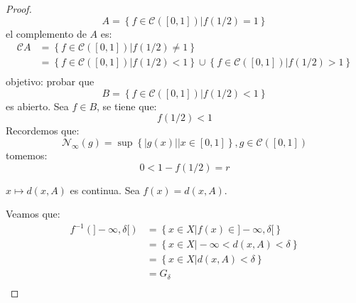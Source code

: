 \documentclass[12pt]{report}
\theoremstyle{largebreak}
\newcommand\abs[1]{\ensuremath{\left|#1\right|}}
\begin{document}
    \begin{proof}
        \begin{equation*}
            A=\left\{f\in\mathcal{C}([0,1])\Big|f(1/2)=1 \right\}
        \end{equation*}
        el complemento de $A$ es:
        \begin{equation*}
            \begin{split}
                \mathcal{C}A&=\left\{f\in\mathcal{C}([0,1])\Big| f(1/2)\neq 1 \right\}\\
                &=\left\{f\in\mathcal{C}([0,1])\Big| f(1/2)<1 \right\}\cup\left\{f\in\mathcal{C}([0,1])\Big| f(1/2)>1 \right\} \\
            \end{split}
        \end{equation*}
        objetivo: probar que
        \begin{equation*}
            B=\left\{f\in\mathcal{C}([0,1])\Big| f(1/2)<1 \right\}
        \end{equation*}
        es abierto. Sea $f\in B$, se tiene que:
        \begin{equation*}
            f(1/2)<1
        \end{equation*}
        Recordemos que:
        \begin{equation}
            \mathcal{N}_\infty(g)=\sup\left\{\abs{g(x)}\Big|x\in[0,1] \right\},g\in\mathcal{C}([0,1])
        \end{equation}
        tomemos:
        \begin{equation*}
            0<1-f(1/2)=r
        \end{equation*}

        $x\mapsto d(x,A)$ es continua. Sea $f(x)=d(x,A)$.

        Veamos que:
        \begin{equation*}
            \begin{split}
                f^{-1}(]-\infty,\delta[)&=\left\{x\in X\Big|f(x)\in]-\infty,\delta[ \right\}\\
                &=\left\{x\in X\Big|-\infty<d(x,A)<\delta \right\}\\
                &=\left\{x\in X\Big|d(x,A)<\delta \right\}\\
                &=G_\delta\\
            \end{split}
        \end{equation*}
    \end{proof}
\end{document}
